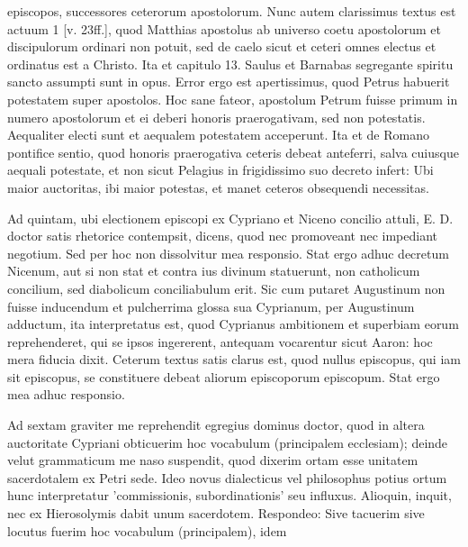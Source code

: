 episcopos, successores ceterorum apostolorum. Nunc autem clarissimus textus est actuum 1 [v. 23ff.], quod Matthias apostolus ab universo coetu apostolorum et discipulorum ordinari non potuit, sed de caelo sicut et ceteri omnes electus et ordinatus est a Christo. Ita et capitulo 13. Saulus et Barnabas segregante spiritu sancto assumpti sunt in opus. Error ergo est apertissimus, quod Petrus habuerit potestatem super apostolos. Hoc sane fateor, apostolum Petrum fuisse primum in numero apostolorum et ei deberi honoris praerogativam, sed non potestatis. Aequaliter electi sunt et aequalem potestatem acceperunt. Ita et de Romano pontifice sentio, quod honoris praerogativa ceteris debeat anteferri, salva cuiusque aequali potestate, et non sicut Pelagius in frigidissimo suo decreto infert: Ubi maior auctoritas, ibi maior potestas, et manet ceteros obsequendi necessitas.

Ad quintam, ubi electionem episcopi ex Cypriano et Niceno concilio attuli, E. D. doctor satis rhetorice contempsit, dicens, quod nec promoveant nec impediant negotium. Sed per hoc non dissolvitur mea responsio. Stat ergo adhuc decretum Nicenum, aut si non stat et contra ius divinum statuerunt, non catholicum concilium, sed diabolicum conciliabulum erit. Sic cum putaret Augustinum non fuisse inducendum et pulcherrima glossa sua Cyprianum, per Augustinum adductum, ita interpretatus est, quod Cyprianus ambitionem et superbiam eorum reprehenderet, qui se ipsos ingererent, antequam vocarentur sicut Aaron: hoc mera fiducia dixit. Ceterum textus satis clarus est, quod nullus episcopus, qui iam sit episcopus, se constituere debeat aliorum episcoporum episcopum. Stat ergo mea adhuc responsio.

Ad sextam graviter me reprehendit egregius dominus doctor, quod in altera auctoritate Cypriani obticuerim hoc vocabulum (principalem ecclesiam); deinde velut grammaticum me naso suspendit, quod dixerim ortam esse unitatem sacerdotalem ex Petri sede. Ideo novus dialecticus vel philosophus potius ortum hunc interpretatur 'commissionis, subordinationis' seu influxus. Alioquin, inquit, nec ex Hierosolymis dabit unum sacerdotem. Respondeo: Sive tacuerim sive locutus fuerim hoc vocabulum (principalem), idem

